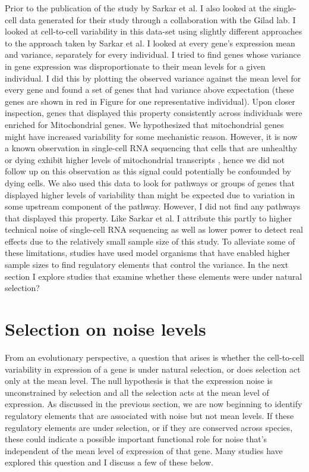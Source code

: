 Prior to the publication of the study by Sarkar et al.\cite{sarkar_discovery_2018} I also looked at the single-cell data generated for their study through a collaboration with the Gilad lab. I looked at cell-to-cell variability in this data-set using slightly different approaches to the approach taken by Sarkar et al. I looked at every gene's expression mean and variance, separately for every individual. I tried to find genes whose variance in gene expression was disproportionate to their mean levels for a given individual. I did this by plotting the observed variance against the mean level for every gene and found a set of genes that had variance above expectation (these genes are shown in red in Figure  for one representative individual). Upon closer inspection, genes that displayed this property consistently across individuals were enriched for Mitochondrial genes. We hypothesized that mitochondrial genes might have increased variability for some mechanistic reason. However, it is now a known observation in single-cell RNA sequencing that cells that are unhealthy or dying exhibit higher levels of mitochondrial transcripts \cite {stuart2019c}, hence we did not follow up on this observation as this signal could potentially be confounded by dying cells. We also used this data to look for pathways or groups of genes that displayed higher levels of variability than might be expected due to variation in some upstream component of the pathway. However, I did not find any pathways that displayed this property. Like Sarkar et al. I attribute this partly to higher technical noise of single-cell RNA sequencing as well as lower power to detect real effects due to the relatively small sample size of this study. To alleviate some of these limitations, studies have used model organisms that have enabled higher sample sizes to find regulatory elements that control the variance. In the next section I explore studies that examine whether these elements were under natural selection?

\section{Selection on noise levels}

From an evolutionary perspective, a question that arises is whether the cell-to-cell variability in expression of a gene is under natural selection, or does selection act only at the mean level. The null hypothesis is that the expression noise is unconstrained by selection and all the selection acts at the mean level of expression. As discussed in the previous section, we are now beginning to identify regulatory elements that are associated with noise but not mean levels. If these regulatory elements are under selection, or if they are conserved across species, these could indicate a possible important functional role for noise that's independent of the mean level of expression of that gene. Many studies have explored this question \cite{lehner2008msb} and I discuss a few of these below.

